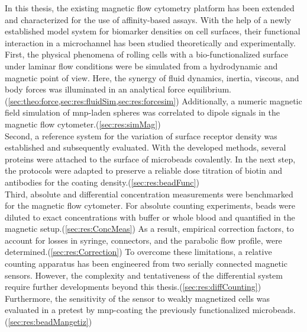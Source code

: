 In this thesis, the existing magnetic flow cytometry platform has been extended and characterized for the use of affinity-based assays. With the help of a newly established model system for biomarker densities on cell surfaces, their functional interaction in a microchannel has been studied theoretically and experimentally.\\
First, the physical phenomena of rolling cells with a bio-functionalized surface under laminar flow conditions were be simulated from a hydrodynamic and magnetic point of view. Here, the synergy of fluid dynamics, inertia, viscous, and body forces was illuminated in an analytical force equilibrium.(\cref{sec:theo:force,sec:res:fluidSim,sec:res:forcesim}) Additionally, a numeric magnetic field simulation of \gls{mnp}-laden spheres was correlated to dipole signals in the magnetic flow cytometer.(\cref{sec:res:simMag})\\
Second, a reference system for the variation of surface receptor density was established and subsequently evaluated. With the developed methods, several proteins were attached to the surface of microbeads covalently. In the next step, the protocols were adapted to preserve a reliable dose titration of biotin and antibodies for the coating density.(\cref{sec:res:beadFunc}) \\
Third, absolute and differential concentration measurements were benchmarked for the magnetic flow cytometer. For absolute counting experiments, beads were diluted to exact concentrations with buffer or whole blood and quantified in the magnetic \linebreak setup.(\cref{sec:res:ConcMeas}) As a result, empirical correction factors, to account for losses in syringe, connectors, and the parabolic flow profile, were determined.(\cref{sec:res:Correction}) To overcome these limitations, a relative counting apparatus has been engineered from two serially connected magnetic sensors. However, the complexity and tentativeness of the differential system require further developments beyond this thesis.(\cref{sec:res:diffCounting}) Furthermore, the sensitivity of the sensor to weakly magnetized cells was evaluated in a pretest by \gls{mnp}-coating the previously functionalized microbeads.(\cref{sec:res:beadMangetiz}) \\
